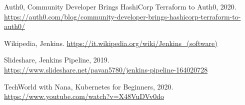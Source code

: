 \documentclass[a4paper,12pt]{report}
\begin{document}
\begin{thebibliography}{00}
Auth0, Community Developer Brings HashiCorp Terraform to Auth0, 2020. \url{https://auth0.com/blog/community-developer-brings-hashicorp-terraform-to-auth0/}

Wikipedia, Jenkins. \url{https://it.wikipedia.org/wiki/Jenkins_(software)}

Slideshare, Jenkins Pipeline, 2019. \url{https://www.slideshare.net/pavan5780/jenkins-pipeline-164020728}

TechWorld with Nana, Kubernetes for Beginners, 2020. \url{https://www.youtube.com/watch?v=X48VuDVv0do}
%
%
\end{thebibliography}
% 
\end{document}
